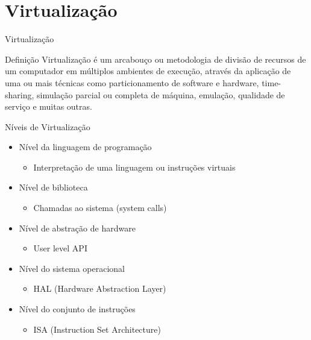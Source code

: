 \documentclass{beamer}
\begin{document}
\section{Virtualização}
\begin{frame}{Virtualização}
    \begin{block}{Definição}
        Virtualização é um arcabouço ou metodologia de divisão de recursos de um computador em múltiplos ambientes de execução, através da aplicação de uma ou mais técnicas como particionamento de software e hardware, time-sharing, simulação parcial ou completa de máquina, emulação, qualidade de serviço e muitas outras.
    \end{block}
\end{frame}

\begin{frame}{Níveis de Virtualização}
    \begin{itemize}
        \item Nível da linguagem de programação
        \begin{itemize}
            \item Interpretação de uma linguagem ou instruções virtuais
        \end{itemize}
        \item Nível de biblioteca
        \begin{itemize}
            \item Chamadas ao sistema (system calls)
        \end{itemize}
        \item Nível de abstração de hardware
        \begin{itemize}
            \item User level API
        \end{itemize}
        \item Nível do sistema operacional
        \begin{itemize}
            \item HAL (Hardware Abstraction Layer)
        \end{itemize}
        \item Nível do conjunto de instruções
        \begin{itemize}
            \item ISA (Instruction Set Architecture)
        \end{itemize}
    \end{itemize}
\end{frame}
\end{document}
